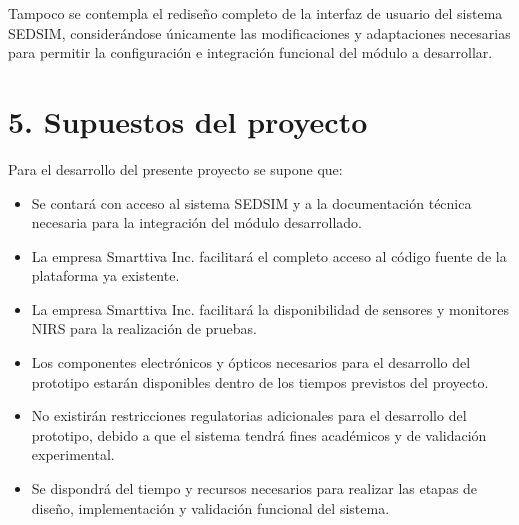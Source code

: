 \documentclass[
11pt, %
]{charter}
\begin{document}
Tampoco se contempla el rediseño completo de la interfaz de usuario del sistema SEDSIM, considerándose únicamente las modificaciones y adaptaciones necesarias para permitir la configuración e integración funcional del módulo a desarrollar.



\section{5. Supuestos del proyecto}
\label{sec:supuestos}

Para el desarrollo del presente proyecto se supone que:

\begin{itemize}
	\item Se contará con acceso al sistema SEDSIM y a la documentación técnica necesaria para la integración del módulo desarrollado.
	
	\item La empresa Smarttiva Inc. facilitará el completo acceso al código fuente de la plataforma ya existente.
	
	\item La empresa Smarttiva Inc. facilitará la disponibilidad de sensores y monitores NIRS para la realización de pruebas.
	
	\item Los componentes electrónicos y ópticos necesarios para el desarrollo del prototipo estarán disponibles dentro de los tiempos previstos del proyecto.
	
	\item No existirán restricciones regulatorias adicionales para el desarrollo del prototipo, debido a que el sistema tendrá fines académicos y de validación experimental.
	
	\item Se dispondrá del tiempo y recursos necesarios para realizar las etapas de diseño, implementación y validación funcional del sistema.
\end{itemize}
\end{document}
